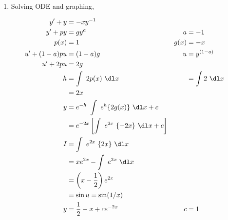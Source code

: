 \begin{enumerate}
    \item Solving ODE and graphing,

          \begin{align}
              y' + y       & = -xy^{-1}                                  \\
              y' +py       & = gy^{a}                                  &
              a            & = -1                                        \\
              p(x)         & = 1                                       &
              g(x)         & = -x                                        \\
              u' + (1-a)pu & = (1-a)g                                  &
              u            & = y^{(1-a)}                                 \\
              u' + 2pu     & = 2g                                        \\
              h            & = \int\ 2p(x)\ \dl x                      &
                           & = \int 2\ \dl x                             \\
                           & = 2x                                        \\
              y            & = e^{-h}\ \int\ e^{h}\{2g(x)\}\ \dl x + c   \\
                           & = e^{-2x} \left[ \int\ e^{2x}\ \{-2x\}
              \ \dl x + c \right]                                        \\
              I            & =\int\ e^{2x}\ \{2x\}\ \dl x                \\
                           & = xe^{2x} - \int\ e^{2x}\ \dl x             \\
                           & = \left( x - \frac{1}{2} \right)e^{2x}      \\
                           & = \sin u = \sin(1/x)                        \\
              y            & = \frac{1}{2} - x + ce^{-2x}              &
              c            & = 1
          \end{align}


\end{enumerate}
